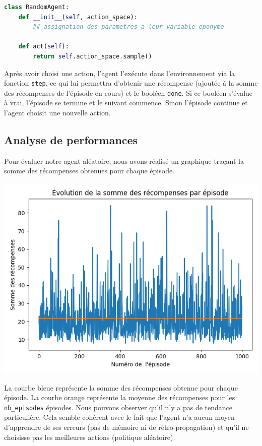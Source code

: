 \documentclass[10pt,a4paper]{article}
\begin{document}
\begin{lstlisting}[language=Python, caption=Implémentation de l'agent aléatoire]
class RandomAgent:
    def __init__(self, action_space):
        ## assignation des parametres a leur variable eponyme

    def act(self):
        return self.action_space.sample()
\end{lstlisting}
Après avoir choisi une action, l'agent l'exécute dans l'environnement via la fonction \lstinline{step}, ce qui lui permettra d'obtenir une récompense (ajoutée à la somme des récompenses de l'épisode en cours) et le booléen \lstinline{done}. Si ce booléen s'évalue à vrai, l'épisode se termine et le suivant commence. Sinon l'épisode continue et l'agent choisit une nouvelle action.

\subsection{Analyse de performances}

Pour évaluer notre agent aléatoire, nous avons réalisé un graphique traçant la somme des récompenses obtenues pour chaque épisode.

\includegraphics[scale=0.5]{evolution_recompenses_random.png} 

La courbe bleue représente la somme des récompenses obtenue pour chaque épisode. La courbe orange représente la moyenne des récompenses pour les \lstinline{nb_episodes} épisodes. Nous pouvons observer qu'il n'y a pas de tendance particulière. Cela semble cohérent avec le fait que l'agent n'a aucun moyen d'apprendre de ses erreurs (pas de mémoire ni de rétro-propagation) et qu'il ne choisisse pas les meilleures actions (politique aléatoire). 
\end{document}
